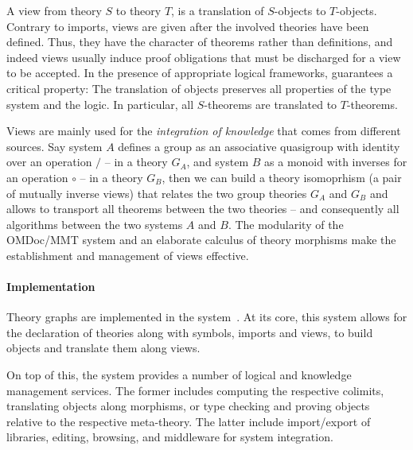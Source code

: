 A view from theory $S$ to theory $T$, is a translation of $S$-objects to $T$-objects.
Contrary to imports, views are given after the involved theories have been defined.  Thus,
they have the character of theorems rather than definitions, and indeed views usually
induce proof obligations that must be discharged for a view to be accepted.  In the
presence of appropriate logical frameworks, \MMT guarantees a critical property: The
translation of objects preserves all properties of the type system and the logic.  In
particular, all $S$-theorems are translated to $T$-theorems.

Views are mainly used for the \emph{integration of knowledge} that comes from different
sources. Say system $A$ defines a group as an associative quasigroup with identity over an
operation $/$ -- in a theory $G_A$, and system $B$ as a monoid with inverses for an
operation $\circ$ -- in a theory $G_B$, then we can build a theory isomoprhism (a pair of
mutually inverse views) that relates the two group theories $G_A$ and $G_B$ and allows to
transport all theorems between the two theories -- and consequently all algorithms between
the two systems $A$ and $B$. The modularity of the OMDoc/MMT system and an elaborate
calculus of theory morphisms make the establishment and management of views effective.

\paragraph{Implementation}
Theory graphs are implemented in the \MMT system~\cite{Rabe:MAGMS13,uniformal:on}.
At its core, this system allows for the declaration of theories along with symbols, imports and views, to build objects and translate them along views.

On top of this, the \MMT system provides a number of logical and knowledge management services.
The former includes computing the respective colimits, translating objects along morphisms, or type checking and proving objects relative to the respective meta-theory.
The latter include import/export of libraries, editing, browsing, and middleware for system integration.

